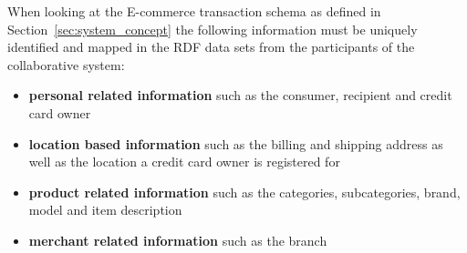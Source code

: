 

When looking at the \gls{E-commerce} transaction schema as defined in Section~\ref{sec:system_concept} the following information must be uniquely identified and mapped in the \gls{RDF} data sets from the participants of the collaborative system: \@

\begin{itemize}
	\item \textbf{personal related information} such as the consumer, recipient and credit card owner
	\item \textbf{location based information} such as the billing and shipping address as well as the location a credit card owner is registered for
	\item \textbf{product related information} such as the categories, subcategories, brand, model and item description
	\item \textbf{merchant related information} such as the branch
\end{itemize}

